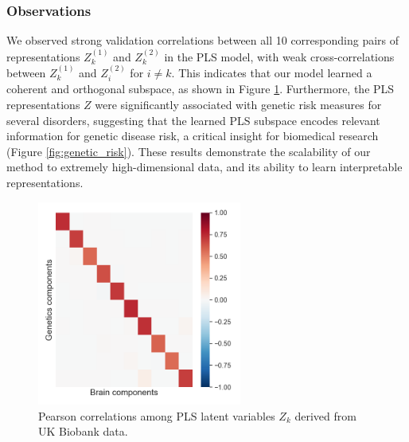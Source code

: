 \subsubsection{Observations}
We observed strong validation correlations between all 10 corresponding pairs of representations \( Z^{(1)}_k \) and \( Z^{(2)}_k \) in the PLS model, with weak cross-correlations between \( Z^{(1)}_k \) and \( Z^{(2)}_i \) for \( i \neq k \).
This indicates that our model learned a coherent and orthogonal subspace, as shown in Figure \ref{fig:UKBB_corr}.
Furthermore, the PLS representations \( Z \) were significantly associated with genetic risk measures for several disorders, suggesting that the learned PLS subspace encodes relevant information for genetic disease risk, a critical insight for biomedical research (Figure \ref{fig:genetic_risk}). These results demonstrate the scalability of our method to extremely high-dimensional data, and its ability to learn interpretable representations.

\begin{figure}
    \centering
    \includegraphics[width=0.6\textwidth,trim={0.8cm 0cm 0.3cm 0cm}]{figures/UKBB/cross_corr.png}
    \caption{Pearson correlations among PLS latent variables \( Z_k \) derived from UK Biobank data.}
    \label{fig:UKBB_corr}
\end{figure}

